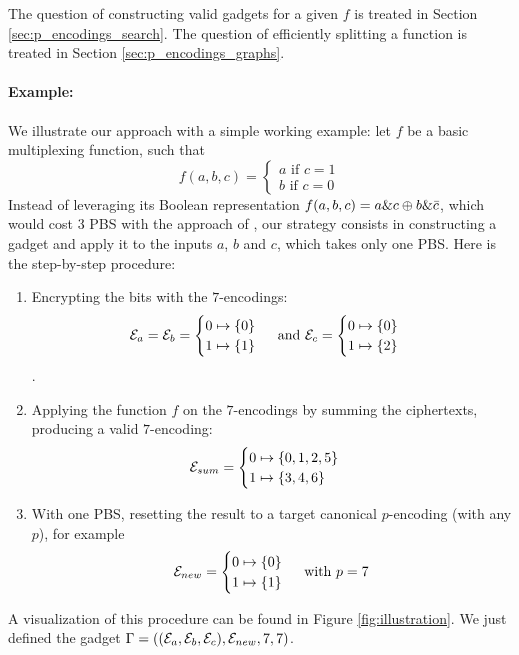 The question of constructing valid gadgets for a given $f$ is treated in Section \ref{sec:p_encodings_search}. The question of efficiently splitting a function is treated in Section \ref{sec:p_encodings_graphs}.


\paragraph{Example:} We illustrate our approach with a simple working example: let $f$ be a basic multiplexing function, such that  $$
f(a, b, c) = \begin{cases}
    a \text{ if } c = 1\\
    b \text{ if } c = 0
\end{cases}
$$
Instead of leveraging its Boolean representation $f(a, b, c) = a \& c \oplus b \& \Bar{c}$, which would cost 3 PBS with the approach of \cite{JC:CGGI20}, our strategy consists in constructing a gadget and apply it to the inputs $a$, $b$ and $c$, which takes only one PBS. Here is the step-by-step procedure:

\begin{enumerate}
    \item Encrypting the bits with the $7$-encodings:\[\mathcal{E}_a = \mathcal{E}_b = \begin{cases} 0 \mapsto \{0\} \\ 1 \mapsto \{1\} \end{cases} \text{ and } \mathcal{E}_c = \begin{cases} 0 \mapsto \{0\} \\ 1 \mapsto \{2\} \end{cases}\].
    \item Applying the function $f$ on the $7$-encodings by summing the ciphertexts, producing a valid $7$-encoding:\[\mathcal{E}_{sum} = \begin{cases} 0 \mapsto \{0, 1, 2, 5\} \\ 1 \mapsto \{3, 4, 6\} \end{cases}\]
    \smallskip
    \item With one PBS, resetting the result to a target canonical $p$-encoding (with any $p$), for example \[\mathcal{E}_{new} = \begin{cases} 0 \mapsto \{0\} \\ 1 \mapsto \{1\} \end{cases} \text{ with } p=7\]
\end{enumerate}

A visualization of this procedure can be found in Figure \ref{fig:illustration}. We just defined the gadget $\Gamma = \left ( (\mathcal{E}_a, \mathcal{E}_b, \mathcal{E}_c), \mathcal{E}_{new}, 7, 7\right )$.


